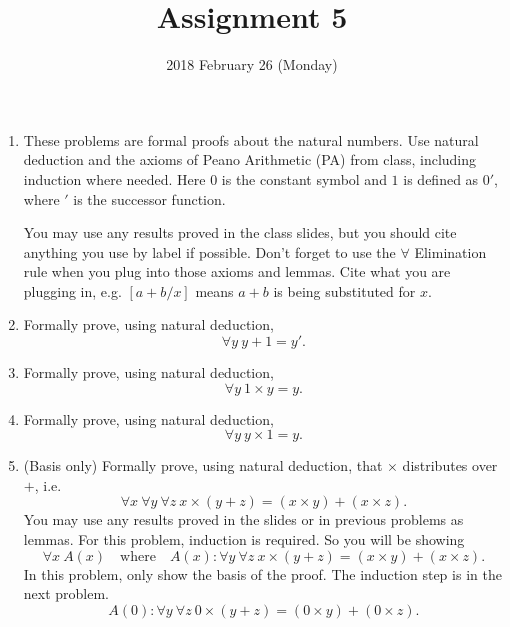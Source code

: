 \documentclass{cs81-homework}
\title{Assignment 5}
\author{}
\date{2018 February 26 (Monday)}
\begin{document}
\begin{introduction}
  \theintroduction
\end{introduction}

\begin{enumerate}

\item[] These problems are formal proofs about the natural numbers. Use natural
  deduction and the axioms of Peano Arithmetic (PA) from class, including
  induction where needed.  Here \(0\) is the constant symbol and \(1\) is
  defined as \(0'\), where \('\) is the successor function.

  You may use any results proved in the class slides, but you should cite
  anything you use by label if possible.  Don't forget to use the \(\forall \)
  Elimination rule when you plug into those axioms and lemmas.  Cite what you
  are plugging in, e.g. \([a+b / x]\) means \(a+b\) is being substituted for
  \(x\).
  
\item {} Formally prove, using natural deduction,
  \[
    \forall y \: y + 1 = y'.
  \]
    
  \begin{solution}
  \end{solution}

\item {} Formally prove, using natural deduction,
  \[
    \forall y \: 1 \times y = y.
  \]
  
  \begin{solution}
  \end{solution}

\item {} Formally prove, using natural deduction,
  \[
    \forall y \: y \times 1 = y.
  \]

  \begin{solution}
  \end{solution}

\item {} (Basis only) Formally prove, using natural deduction, that
  \(\times\) distributes over \(+\), i.e.
  \[
    \forall x \: \forall y \: \forall z \: x \times (y + z) = (x \times y) + (x
    \times z).
  \]
  You may use any results proved in the slides or in previous problems as
  lemmas.  For this problem, induction is required.  So you will be showing
  \[
    \forall x \: A(x) \quad \text{where} \quad A(x)\colon \forall y \: \forall z
    \: x \times (y + z) = (x \times y) + (x \times z).
  \]
  In this problem, only show the basis of the proof.  The induction step is in
  the next problem.
  \[
    A(0)\colon \forall y \: \forall z \: 0 \times (y + z) = (0 \times y) + (0
    \times z).
  \]


\end{enumerate}
\end{document}
